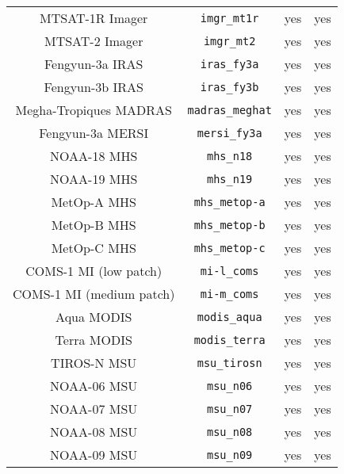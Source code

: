 \begin{center}
\begin{longtable}{c c c c}
  MTSAT-1R Imager                    & \texttt{imgr\_mt1r}          &  yes     &  yes       \\
  MTSAT-2 Imager                     & \texttt{imgr\_mt2}           &  yes     &  yes       \\
  Fengyun-3a IRAS                    & \texttt{iras\_fy3a}          &  yes     &  yes       \\
  Fengyun-3b IRAS                    & \texttt{iras\_fy3b}          &  yes     &  yes       \\
  Megha-Tropiques MADRAS             & \texttt{madras\_meghat}      &  yes     &  yes       \\
  Fengyun-3a MERSI                   & \texttt{mersi\_fy3a}         &  yes     &  yes       \\
  NOAA-18 MHS                        & \texttt{mhs\_n18}            &  yes     &  yes       \\
  NOAA-19 MHS                        & \texttt{mhs\_n19}            &  yes     &  yes       \\
  MetOp-A MHS                        & \texttt{mhs\_metop-a}        &  yes     &  yes       \\
  MetOp-B MHS                        & \texttt{mhs\_metop-b}        &  yes     &  yes       \\
  MetOp-C MHS                        & \texttt{mhs\_metop-c}        &  yes     &  yes       \\
  COMS-1 MI (low patch)              & \texttt{mi-l\_coms}          &  yes     &  yes       \\
  COMS-1 MI (medium patch)           & \texttt{mi-m\_coms}          &  yes     &  yes       \\
  Aqua MODIS                         & \texttt{modis\_aqua}         &  yes     &  yes       \\
  Terra MODIS                        & \texttt{modis\_terra}        &  yes     &  yes       \\
  TIROS-N MSU                        & \texttt{msu\_tirosn}         &  yes     &  yes       \\
  NOAA-06 MSU                        & \texttt{msu\_n06}            &  yes     &  yes       \\
  NOAA-07 MSU                        & \texttt{msu\_n07}            &  yes     &  yes       \\
  NOAA-08 MSU                        & \texttt{msu\_n08}            &  yes     &  yes       \\
  NOAA-09 MSU                        & \texttt{msu\_n09}            &  yes     &  yes       \\

\end{longtable}
\end{center}
